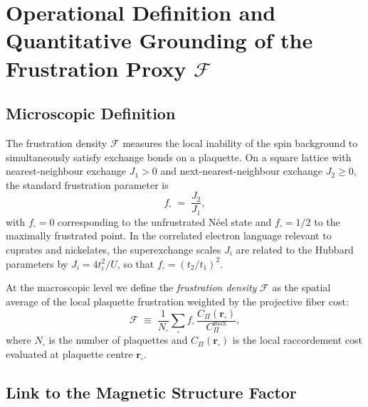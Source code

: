 \section{Operational Definition and Quantitative Grounding of the Frustration Proxy $\mathcal{F}$}
  \label{app:frustration}

  \subsection{Microscopic Definition}
    \label{subsec:microscopic-definition}

    The frustration density $\mathcal{F}$ measures the local inability of the spin background to
    simultaneously satisfy exchange bonds on a plaquette.
    On a square lattice with nearest-neighbour exchange $J_1 > 0$ and next-nearest-neighbour
    exchange $J_2 \geq 0$, the standard frustration parameter is
    \begin{equation}
      f_\square \;=\; \frac{J_2}{J_1},
      \label{eq:fplaquette}
    \end{equation}
    with $f_\square = 0$ corresponding to the unfrustrated N\'{e}el state and $f_\square = 1/2$
    to the maximally frustrated point.
    In the correlated electron language relevant to cuprates and nickelates, the superexchange
    scales $J_i$ are related to the Hubbard parameters by $J_i = 4t_i^2/U$, so that
    $f_\square = (t_2/t_1)^2$.

    At the macroscopic level we define the \emph{frustration density} $\mathcal{F}$ as the
    spatial average of the local plaquette frustration weighted by the projective fiber cost:
    \begin{equation}
      \mathcal{F} \;\equiv\; \frac{1}{N_\square}\sum_{\square} f_\square \,
      \frac{C_\Pi(\mathbf{r}_\square)}{C_\Pi^{\max}},
      \label{eq:Fmicro}
    \end{equation}
    where $N_\square$ is the number of plaquettes and $C_\Pi(\mathbf{r}_\square)$ is the local
    raccordement cost evaluated at plaquette centre $\mathbf{r}_\square$.

  \subsection{Link to the Magnetic Structure Factor}
    \label{subsec:link-to-the-magnetic-structure-factor}

